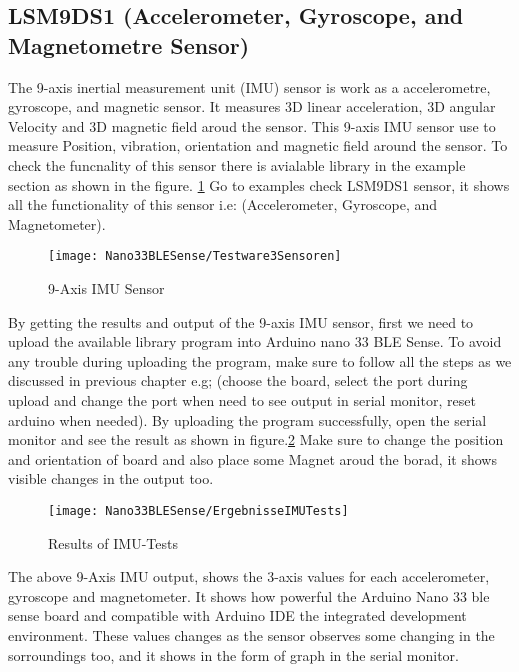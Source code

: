 \subsection{LSM9DS1 (Accelerometer, Gyroscope, and Magnetometre Sensor)}

The 9-axis inertial measurement unit (IMU) sensor is work as a accelerometre, gyroscope, and magnetic sensor. It measures 3D linear acceleration, 3D angular Velocity and 3D magnetic field aroud the sensor. This 9-axis IMU sensor use to measure Position, vibration, orientation and magnetic field around the sensor. To check the funcnality of this sensor there is avialable library in the example section as shown in the figure. \ref{fig:Testware} Go to examples check LSM9DS1 sensor, it shows all the functionality of this sensor i.e: (Accelerometer, Gyroscope, and Magnetometer).


\begin{figure}[htbp]
    \centering
    \texttt{[image: Nano33BLESense/Testware3Sensoren]}
    \caption{9-Axis IMU Sensor}
    \label{fig:Testware}
\end{figure}

By getting the results and output of the 9-axis IMU sensor, first we need to upload the available library program into Arduino nano 33 BLE Sense. To avoid any trouble during uploading the program, make sure to follow all the steps as we discussed in previous chapter e.g; (choose the board, select the port during upload and change the port when need to see output in serial monitor, reset arduino when needed). By uploading the program successfully, open the serial monitor and see the result as shown in figure.\ref{fig:IMU-Test} Make sure to change the position and orientation of board and also place some Magnet aroud the borad, it shows visible changes in the output too.

\begin{figure}[htbp]
    \centering
    \texttt{[image: Nano33BLESense/ErgebnisseIMUTests]}
    \caption{Results of IMU-Tests}
    \label{fig:IMU-Test}
\end{figure}

The above 9-Axis IMU output, shows the 3-axis values for each accelerometer, gyroscope and magnetometer. It shows how powerful the Arduino Nano 33 ble sense board and compatible with Arduino IDE the integrated development environment. These values changes as the sensor observes some changing in the sorroundings too, and it shows in the form of graph in the serial monitor. 


